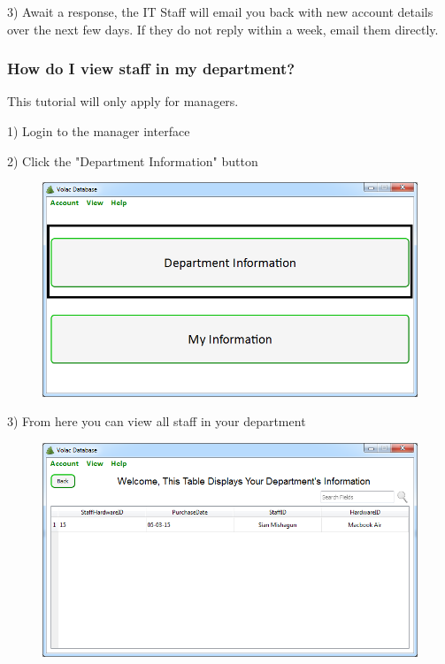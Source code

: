 3) Await a response, the IT Staff will email you back with new account details over the next few days. If they do not reply within a week, email them directly.

\subsubsection{How do I view staff in my department?}\label{department}

This tutorial will only apply for managers.

1) Login to the manager interface

2) Click the "Department Information" button

\begin{figure}[H]
    \includegraphics[width=\textwidth]{./Manual/Images/department.png}
\end{figure}

3) From here you can view all staff in your department

\begin{figure}[H]
    \includegraphics[width=\textwidth]{./Manual/Images/department1.png}
\end{figure}

